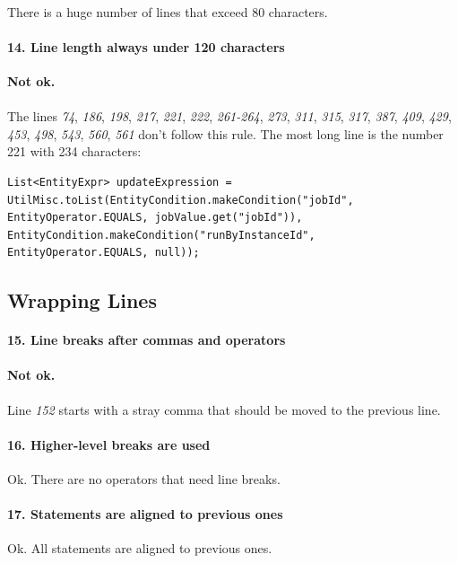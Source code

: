 \documentclass[english]{article}
\begin{document}
\paragraph{}
There is a huge number of lines that exceed 80 characters.

\paragraph{14. Line length always under 120 characters}
\textcolor{cornellred}{\textbf{Not ok.}}
\paragraph{}
The lines \textit{74}, \textit{186}, \textit{198}, \textit{217}, \textit{221}, \textit{222}, \textit{261-264}, \textit{273}, \textit{311}, \textit{315}, \textit{317}, \textit{387}, \textit{409}, \textit{429}, \textit{453}, \textit{498}, \textit{543}, \textit{560}, \textit{561} don't follow this rule. The most long line is the number 221 with 234 characters:

\begin{lstlisting}
List<EntityExpr> updateExpression = UtilMisc.toList(EntityCondition.makeCondition("jobId", EntityOperator.EQUALS, jobValue.get("jobId")), EntityCondition.makeCondition("runByInstanceId", EntityOperator.EQUALS, null));
\end{lstlisting}

\subsection{Wrapping Lines}
\paragraph{15. Line breaks after commas and operators}
\textcolor{cornellred}{\textbf{Not ok.}}
\paragraph{}
Line \textit{152} starts with a stray comma that should be moved to the previous line.

\paragraph{16. Higher-level breaks are used}
Ok. There are no operators that need line breaks.

\paragraph{17. Statements are aligned to previous ones}
Ok. All statements are aligned to previous ones.
\end{document}
